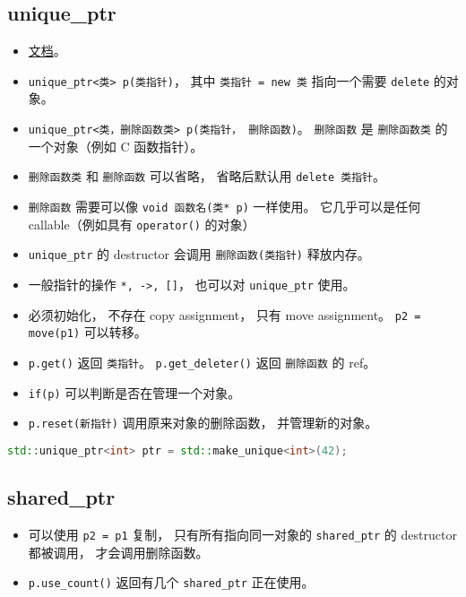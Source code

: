 
\begin{issues}
\issueDraft
\end{issues}

\subsection{unique\_ptr}
\begin{itemize}
\item \href{https://en.cppreference.com/w/cpp/memory/unique_ptr}{文档}。
\item \verb`unique_ptr<类> p(类指针)`， 其中 \verb`类指针 = new 类` 指向一个需要 \verb`delete` 的对象。
\item \verb`unique_ptr<类，删除函数类> p(类指针， 删除函数)`。 \verb`删除函数` 是 \verb`删除函数类` 的一个对象（例如 C 函数指针）。
\item \verb`删除函数类` 和 \verb`删除函数` 可以省略， 省略后默认用 \verb`delete 类指针`。
\item \verb`删除函数` 需要可以像 \verb`void 函数名(类* p)` 一样使用。 它几乎可以是任何 callable（例如具有 \verb`operator()` 的对象）
\item \verb`unique_ptr` 的 destructor 会调用 \verb`删除函数(类指针)` 释放内存。
\item 一般指针的操作 \verb`*, ->, []`， 也可以对 \verb`unique_ptr` 使用。
\item 必须初始化， 不存在 copy assignment， 只有 move assignment。 \verb`p2 = move(p1)` 可以转移。
\item \verb`p.get()` 返回 \verb`类指针`。 \verb`p.get_deleter()` 返回 \verb`删除函数` 的 ref。
\item \verb`if(p)` 可以判断是否在管理一个对象。
\item \verb`p.reset(新指针)` 调用原来对象的删除函数， 并管理新的对象。
\end{itemize}
\begin{lstlisting}[language=cpp]
std::unique_ptr<int> ptr = std::make_unique<int>(42);
\end{lstlisting}


\subsection{shared\_ptr}
\begin{itemize}
\item 可以使用 \verb`p2 = p1` 复制， 只有所有指向同一对象的 \verb`shared_ptr` 的 destructor 都被调用， 才会调用删除函数。
\item \verb`p.use_count()` 返回有几个 \verb`shared_ptr` 正在使用。
\end{itemize}

